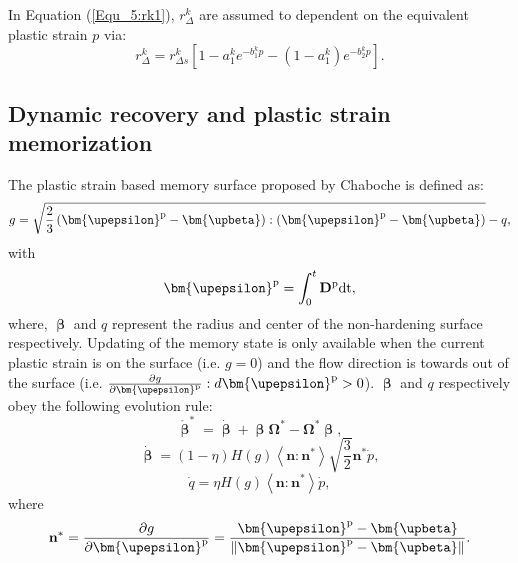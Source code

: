 In Equation (\ref{Equ_5:rk1}), $r_\Delta ^k$ are assumed to dependent on the equivalent plastic strain $p$ via:
\begin{equation}
\label{Equ_5:rdeltak1}
r_\Delta ^k = r_{\Delta s}^k\left[ {1 - a_1^k{e^{ - b_1^kp}} - (1-a_1^k){e^{ - b_2^kp}} }\right].
\end{equation}

\subsection{Dynamic recovery and plastic strain memorization}
The plastic strain based memory surface proposed by Chaboche is defined as:
\begin{equation}
\label{Equ_5:g1}
g = \sqrt {\frac{2}{3}\left( {{{\bm{\upepsilon }}^{\rm{p}}} - {\bm{\upbeta}}} \right):\left( {{{\bm{\upepsilon }}^{\rm{p}}} - {\bm{\upbeta}}} \right)}  - q,
\end{equation}
with
\begin{equation}
{{\bm{\upepsilon }}^{\rm{p}}}=\int_0^t{{\mathbf{D}}^{\rm{p}} \rm{dt}},
\end{equation}
where, $\bm{\upbeta}$ and $q$ represent the radius and center of the non-hardening surface respectively.
Updating of the memory state is only available when the current plastic strain is on the surface (i.e. $g=0$) and the flow direction is towards out of the surface (i.e. $\frac{{\partial g}}{{\partial {{\bm{\upepsilon }}^{\rm{p}}}}}:d{{\bm{\upepsilon }}^{\rm{p}}} > 0$). $\bm{\upbeta}$ and $q$ respectively obey the following evolution rule:
\begin{equation}
{\mathring {\bm{\upbeta }}^{*}} = \dot {\bm{\upbeta }}  + \bm{\upbeta } {{\mathbf{\Omega }}^*} - {{\mathbf{\Omega }}^*}\bm{\upbeta },
\end{equation}
\begin{equation}
\label{Equ_5:dotbeta1}
\dot{\bm{\upbeta}}  = \left( {1 - \eta } \right)H\left( g \right)\left\langle {{\mathbf{n}}:{{\mathbf{n}}^*}} \right\rangle \sqrt {\frac{3}{2}} {{\mathbf{n}}^*}\dot p,
\end{equation}
\begin{equation}
\label{Equ_5:dotq1}
\dot q = \eta H\left( g \right)\left\langle {{\mathbf{n}}:{{\mathbf{n}}^*}} \right\rangle \dot p,
\end{equation}
where
\begin{equation}
\label{Equ_5:nstar}
{{\mathbf{n}}^*} = \frac{{\partial g}}{{\partial {{\bm{\upepsilon }}^{\rm{p}}}}} = \frac{{{{\bm{\upepsilon }}^{\rm{p}}} - {\bm{\upbeta}}}}{{\left\| {{{\bm{\upepsilon }}^{\rm{p}}} - {\bm{\upbeta}}} \right\|}}.
\end{equation}

